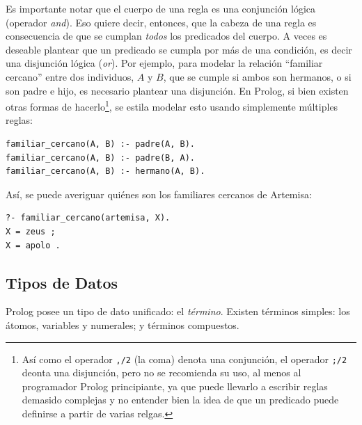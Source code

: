\documentclass[12pt,titlepage]{article}
\begin{document}
Es importante notar que el cuerpo de una regla es una conjunción lógica (operador \emph{and}). Eso quiere decir, entonces, que la cabeza de una regla es consecuencia de que se cumplan \emph{todos} los predicados del cuerpo. A veces es deseable plantear que un predicado se cumpla por más de una condición, es decir una disjunción lógica (\emph{or}). Por ejemplo, para modelar la relación ``familiar cercano'' entre dos individuos, $A$ y $B$, que se cumple si ambos son hermanos, o si son padre e hijo, es necesario plantear una disjunción. En Prolog, si bien existen otras formas de hacerlo\footnote{Así como el operador \lstinline|,/2| (la coma) denota una conjunción, el operador \lstinline|;/2| deonta una disjunción, pero no se recomienda su uso, al menos al programador Prolog principiante, ya que puede llevarlo a escribir reglas demasido complejas y no entender bien la idea de que un predicado puede definirse a partir de varias relgas.}, se estila modelar esto usando simplemente múltiples reglas:
\begin{lstlisting}
familiar_cercano(A, B) :- padre(A, B).
familiar_cercano(A, B) :- padre(B, A).
familiar_cercano(A, B) :- hermano(A, B).
\end{lstlisting}

Así, se puede averiguar quiénes son los familiares cercanos de Artemisa:
\begin{lstlisting}
?- familiar_cercano(artemisa, X).
X = zeus ;
X = apolo .
\end{lstlisting}


\subsection{Tipos de Datos}
\label{sec:datos}

Prolog posee un tipo de dato unificado: el \emph{término}. Existen términos simples: los átomos, variables y numerales; y términos compuestos.
\end{document}
